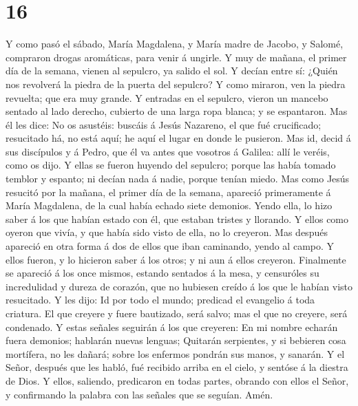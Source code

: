 \hypertarget{section-15}{%
\section{16}\label{section-15}}

 Y como pasó el sábado, María Magdalena, y María madre de
Jacobo, y Salomé, compraron drogas aromáticas, para venir á ungirle.
 Y muy de mañana, el primer día de la semana, vienen al
sepulcro, ya salido el sol.  Y decían entre sí: ¿Quién nos
revolverá la piedra de la puerta del sepulcro?  Y como
miraron, ven la piedra revuelta; que era muy grande.  Y
entradas en el sepulcro, vieron un mancebo sentado al lado derecho,
cubierto de una larga ropa blanca; y se espantaron.  Mas
él les dice: No os asustéis: buscáis á Jesús Nazareno, el que fué
crucificado; resucitado há, no está aquí; he aquí el lugar en donde le
pusieron.  Mas id, decid á sus discípulos y á Pedro, que
él va antes que vosotros á Galilea: allí le veréis, como os dijo.
 Y ellas se fueron huyendo del sepulcro; porque las había
tomado temblor y espanto; ni decían nada á nadie, porque tenían miedo.
 Mas como Jesús resucitó por la mañana, el primer día de
la semana, apareció primeramente á María Magdalena, de la cual había
echado siete demonios.  Yendo ella, lo hizo saber á los
que habían estado con él, que estaban tristes y llorando.
 Y ellos como oyeron que vivía, y que había sido visto de
ella, no lo creyeron.  Mas después apareció en otra forma
á dos de ellos que iban caminando, yendo al campo.  Y
ellos fueron, y lo hicieron saber á los otros; y ni aun á ellos
creyeron.  Finalmente se apareció á los once mismos,
estando sentados á la mesa, y censuróles su incredulidad y dureza de
corazón, que no hubiesen creído á los que le habían visto resucitado.
 Y les dijo: Id por todo el mundo; predicad el evangelio
á toda criatura.  El que creyere y fuere bautizado, será
salvo; mas el que no creyere, será condenado.  Y estas
señales seguirán á los que creyeren: En mi nombre echarán fuera
demonios; hablarán nuevas lenguas;  Quitarán serpientes,
y si bebieren cosa mortífera, no les dañará; sobre los enfermos pondrán
sus manos, y sanarán.  Y el Señor, después que les habló,
fué recibido arriba en el cielo, y sentóse á la diestra de Dios.
 Y ellos, saliendo, predicaron en todas partes, obrando
con ellos el Señor, y confirmando la palabra con las señales que se
seguían. Amén.
